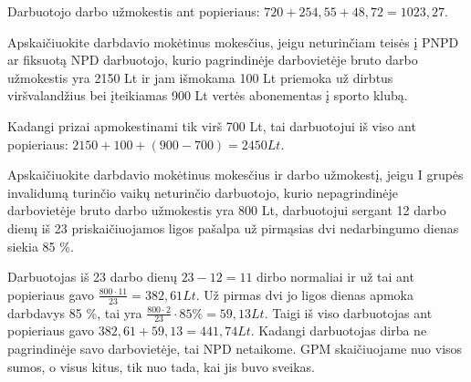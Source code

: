 \begin{tasks}
\begin{task}
\begin{solution}
      Darbuotojo darbo užmokestis ant popieriaus:
      $720 + 254,55 + 48,72 = 1023,27$.


    \end{solution}
  \end{task}

  \begin{task}
    \begin{condition}
      Apskaičiuokite darbdavio mokėtinus mokesčius, jeigu
      neturinčiam teisės į PNPD ar fiksuotą NPD darbuotojo, kurio
      pagrindinėje darbovietėje bruto darbo užmokestis yra 2150 Lt ir
      jam išmokama 100 Lt priemoka už dirbtus viršvalandžius bei
      įteikiamas 900 Lt vertės abonementas į sporto klubą.
    \end{condition}
    \begin{solution}
      Kadangi prizai apmokestinami tik virš 700 Lt, tai darbuotojui
      iš viso ant popieriaus: $2150 + 100 + (900 - 700) = 2450 Lt$.

      
    \end{solution}
  \end{task}

  \begin{task}
    \begin{condition}
      Apskaičiuokite darbdavio mokėtinus mokesčius ir darbo
      užmokestį, jeigu I grupės invalidumą turinčio vaikų neturinčio
      darbuotojo, kurio nepagrindinėje darbovietėje bruto darbo
      užmokestis yra 800 Lt, darbuotojui sergant 12 darbo dienų iš 23
      priskaičiuojamos ligos pašalpa už pirmąsias dvi nedarbingumo
      dienas siekia 85 \%.
    \end{condition}
    \begin{solution}
      Darbuotojas iš 23 darbo dienų $23 - 12 = 11$ dirbo normaliai
      ir už tai ant popieriaus gavo
      $\frac{800 \cdot 11}{23} = 382,61 Lt$. Už pirmas dvi jo
      ligos dienas apmoka darbdavys 85 \%, tai yra
      $\frac{800 \cdot 2}{23} \cdot 85\% = 59,13 Lt$.
      Taigi iš viso darbuotojas ant popieriaus gavo
      $382,61 + 59,13 = 441,74 Lt$. Kadangi darbuotojas dirba
      ne pagrindinėje savo darbovietėje, tai NPD netaikome.
      GPM skaičiuojame nuo visos sumos, o visus kitus, tik
      nuo tada, kai jis buvo sveikas.


\end{solution}
\end{task}
\end{tasks}
